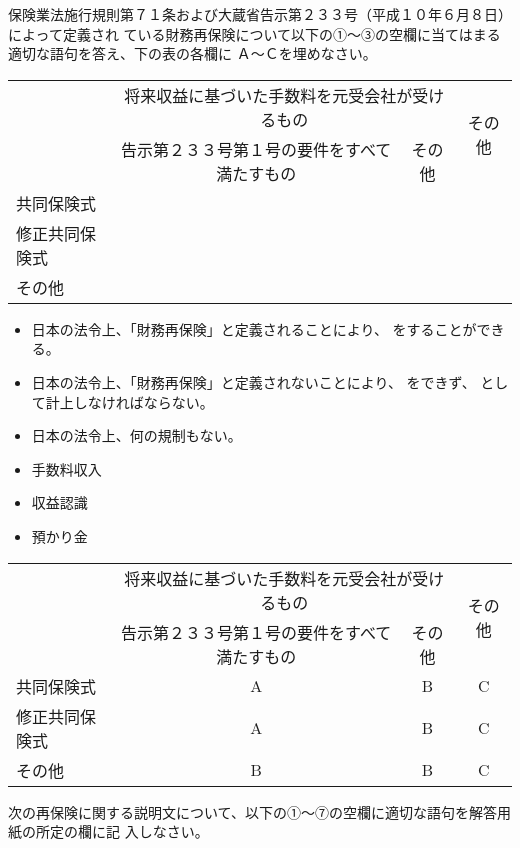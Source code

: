 \documentclass[report,gutter=10mm,fore-edge=10mm,uplatex,dvipdfmx]{jlreq}
\begin{document}
保険業法施行規則第７１条および大蔵省告示第２３３号（平成１０年６月８日）によって定義され
ている財務再保険について以下の①～③の空欄に当てはまる適切な語句を答え、下の表の各欄に
Ａ～Ｃを埋めなさい。

\begin{tabular}{|l|c|c|c|}
 \hline
\multirow{2}{*}{}& \multicolumn{2}{c|}{将来収益に基づいた手数料を元受会社が受けるもの}
 &\multirow{2}{*}{その他}\\  \cline{2-3}
&告示第２３３号第１号の要件をすべて満たすもの&その他&\\ \hline
共同保険式  & & & \\ \hline
修正共同保険式 & & & \\ \hline
その他 & & & \\ \hline
\end{tabular}

\begin{itemize}
\item[ Ａ：] 日本の法令上、「財務再保険」と定義されることにより、 をすることができる。
\item[ Ｂ：] 日本の法令上、「財務再保険」と定義されないことにより、 をできず、 として計上しなければならない。
\item[ Ｃ：] 日本の法令上、何の規制もない。
\end{itemize}
\answer{}

\begin{itemize}
\item[ ①: ] 手数料収入
\item[ ②: ] 収益認識
\item[ ③: ] 預かり金
\end{itemize}

\begin{tabular}{|l|c|c|c|}
 \hline
\multirow{2}{*}{}& \multicolumn{2}{c|}{将来収益に基づいた手数料を元受会社が受けるもの}
 &\multirow{2}{*}{その他}\\  \cline{2-3}
&告示第２３３号第１号の要件をすべて満たすもの&その他&\\ \hline
共同保険式  & A&B &C \\ \hline
修正共同保険式 &A &B & C \\ \hline
その他 & B & B & C\\ \hline
\end{tabular}



次の再保険に関する説明文について、以下の①～⑦の空欄に適切な語句を解答用紙の所定の欄に記
入しなさい。
\end{document}
